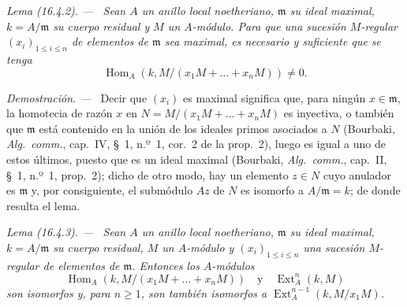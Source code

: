 \documentclass[10pt,oneside]{book}
\makeatletter
\newcommand{\setmanualcurrentlabel}[1]{\def\@currentlabel{#1}}
\newcommand{\oldpage}[2][]{%
  \setcounter{footnote}{0}%
  \marginpar{\scriptsize\textbf{#1}~|~#2}\ignorespaces}
\newenvironment{lemma}[1][]{%
  \setmanualcurrentlabel{#1}\par\medskip\noindent\itshape Lema (#1). ---\ }{\par}
\newenvironment{proof}{%
  \par\medskip\noindent\textit{Demostración. ---\ }}{\par}
\makeatother
\begin{document}
\begin{lemma}[16.4.2]
\label{0.16.4.2-es}
Sean $A$ un anillo local noetheriano, $\mathfrak{m}$ su ideal maximal,
$k=A/\mathfrak{m}$ su cuerpo residual y $M$ un $A$-módulo. Para que una
sucesión $M$-regular $(x_i)_{1\leq i\leq n}$ de elementos de $\mathfrak{m}$
sea maximal, es necesario y suficiente que se tenga
\[
  \operatorname{Hom}_A(k,M/(x_1M+\ldots+x_nM))\neq0.
\]
\end{lemma}

\begin{proof}
Decir que $(x_i)$ es maximal significa que, para ningún $x\in\mathfrak{m}$,
la homotecia de razón $x$ en $N=M/(x_1M+\ldots+x_nM)$ es inyectiva, o también
que $\mathfrak{m}$ está contenido en la unión de los ideales primos asociados
a $N$ (Bourbaki, \emph{Alg.~comm.}, cap.~IV, \S~1, n.º~1, cor.~2 de la
prop.~2), luego es igual a uno de estos últimos, puesto que es un ideal
\oldpage[0\textsubscript{IV-1}]{33}
maximal (Bourbaki, \emph{Alg.~comm.}, cap.~II, \S~1, n.º~1, prop.~2); dicho de
otro modo, hay un elemento $z\in N$ cuyo anulador es $\mathfrak{m}$ y, por
consiguiente, el submódulo $Az$ de $N$ es isomorfo a
$A/\mathfrak{m}=k$; de donde resulta el lema.
\end{proof}

\begin{lemma}[16.4.3]
\label{0.16.4.3-es}
Sean $A$ un anillo local noetheriano, $\mathfrak{m}$ su ideal maximal,
$k=A/\mathfrak{m}$ su cuerpo residual, $M$ un $A$-módulo y
$(x_i)_{1\leq i\leq n}$ una sucesión $M$-regular de elementos de
$\mathfrak{m}$. Entonces los $A$-módulos
\[
  \operatorname{Hom}_A(k,M/(x_1M+\ldots+x_nM))
  \quad\text{y}\quad \operatorname{Ext}^n_A(k,M)
\]
son isomorfos y, para $n\geq1$, son también isomorfos a
$\operatorname{Ext}^{n-1}_A(k,M/x_1M)$.
\end{lemma}
\end{document}
